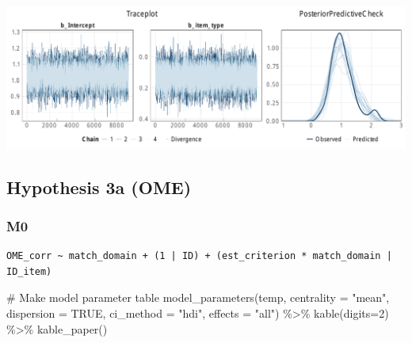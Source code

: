 \documentclass[
  letterpaper,
  DIV=11,
  numbers=noendperiod]{scrartcl}
\newenvironment{Shaded}{\begin{snugshade}}{\end{snugshade}}
\newcommand{\AttributeTok}[1]{\textcolor[rgb]{0.40,0.45,0.13}{#1}}
\newcommand{\CommentTok}[1]{\textcolor[rgb]{0.37,0.37,0.37}{#1}}
\newcommand{\ConstantTok}[1]{\textcolor[rgb]{0.56,0.35,0.01}{#1}}
\newcommand{\DecValTok}[1]{\textcolor[rgb]{0.68,0.00,0.00}{#1}}
\newcommand{\FunctionTok}[1]{\textcolor[rgb]{0.28,0.35,0.67}{#1}}
\newcommand{\NormalTok}[1]{\textcolor[rgb]{0.00,0.23,0.31}{#1}}
\newcommand{\OtherTok}[1]{\textcolor[rgb]{0.00,0.23,0.31}{#1}}
\newcommand{\SpecialCharTok}[1]{\textcolor[rgb]{0.37,0.37,0.37}{#1}}
\newcommand{\StringTok}[1]{\textcolor[rgb]{0.13,0.47,0.30}{#1}}
\begin{document}
\includegraphics{supplement_files/figure-pdf/h2bM1kcal-1.pdf}

\subsection{Hypothesis 3a (OME)}\label{hypothesis-3a-ome}

\subsubsection{M0}\label{m0}

\begin{Shaded}
\end{Shaded}

\begin{verbatim}
OME_corr ~ match_domain + (1 | ID) + (est_criterion * match_domain | ID_item) 
\end{verbatim}

\begin{Shaded}
\begin{Highlighting}[]
\CommentTok{\# Make model parameter table}
\FunctionTok{model\_parameters}\NormalTok{(temp, }\AttributeTok{centrality =} \StringTok{"mean"}\NormalTok{, }\AttributeTok{dispersion =} \ConstantTok{TRUE}\NormalTok{, }
                 \AttributeTok{ci\_method =} \StringTok{"hdi"}\NormalTok{, }\AttributeTok{effects =} \StringTok{"all"}\NormalTok{) }\SpecialCharTok{\%\textgreater{}\%} 
  \FunctionTok{kable}\NormalTok{(}\AttributeTok{digits=}\DecValTok{2}\NormalTok{) }\SpecialCharTok{\%\textgreater{}\%} \FunctionTok{kable\_paper}\NormalTok{()}
\end{Highlighting}
\end{Shaded}
\end{document}

